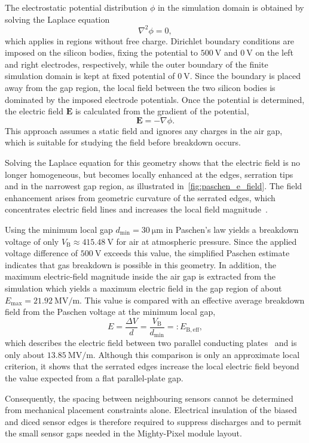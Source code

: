 The electrostatic potential distribution $\phi$ in the simulation domain is obtained by solving the Laplace equation
\begin{equation}
    \nabla^2\phi = 0,
\end{equation}
which applies in regions without free charge. Dirichlet boundary conditions are imposed on the silicon bodies, fixing the potential to $\SI{500}{\volt}$ and $\SI{0}{\volt}$ on the left and right electrodes, respectively, while the outer boundary of the finite simulation domain is kept at fixed potential of $\SI{0}{\volt}$. Since the boundary is placed away from the gap region, the local field between the two silicon bodies is dominated by the imposed electrode potentials.
Once the potential is determined, the electric field $\mathbf{E}$ is calculated from the gradient of the potential,
\begin{equation}
    \mathbf{E} = -\nabla\phi.
\end{equation}
This approach assumes a static field and ignores any charges in the air gap, which is suitable for studying the field before breakdown occurs.\par
Solving the Laplace equation for this geometry shows that the electric field is no longer homogeneous, but becomes locally enhanced at the edges, serration tips and in the narrowest gap region, as illustrated in~\cref{fig:paschen_e_field}. The field enhancement arises from geometric curvature of the serrated edges, which concentrates electric field lines and increases the local field magnitude~\cite{Moore2003-rk}.\par
Using the minimum local gap $d_\mathrm{min} = \SI{30}{\micro\meter}$ in Paschen's law yields a breakdown voltage of only $V_\mathrm{B}\approx\SI{415.48}{\volt}$ for air at atmospheric pressure. Since the applied voltage difference of $\SI{500}{\volt}$ exceeds this value, the simplified Paschen estimate indicates that gas breakdown is possible in this geometry. In addition, the maximum electric-field magnitude inside the air gap is extracted from the simulation which yields a maximum electric field in the gap region of about $E_\mathrm{max}=\SI{21.92}{\mega\volt\per\meter}$.
This value is compared with an effective average breakdown field from the Paschen voltage at the minimum local gap,
\begin{equation}
    E = \frac{\Delta V}{d} = \frac{V_\mathrm{B}}{d_\mathrm{min}} =: E_\mathrm{B,eff},
\end{equation}
which describes the electric field between two parallel conducting plates~\cite{lumenlearningElectricPotential} and is only about $\SI{13.85}{\mega\volt\per\meter}$. Although this comparison is only an approximate local criterion, it shows that the serrated edges increase the local electric field beyond the value expected from a flat parallel-plate gap.\par
Consequently, the spacing between neighbouring sensors cannot be determined from mechanical placement constraints alone. Electrical insulation of the biased and diced sensor edges is therefore required to suppress discharges and to permit the small sensor gaps needed in the Mighty-Pixel module layout.
%
